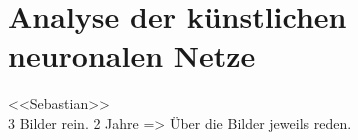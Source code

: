 \chapter{Analyse der künstlichen neuronalen Netze}
<<Sebastian>>\\
3 Bilder rein. 2 Jahre => Über die Bilder jeweils reden.\\
\Blindtext